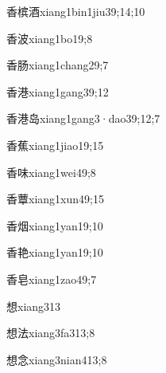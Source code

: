 \begin{verbete}{香槟酒}{xiang1bin1jiu3}{9;14;10}
\end{verbete}
\begin{verbete}{香波}{xiang1bo1}{9;8}
\end{verbete}
\begin{verbete}{香肠}{xiang1chang2}{9;7}
\end{verbete}
\begin{verbete}{香港}{xiang1gang3}{9;12}
\end{verbete}
\begin{verbete}{香港岛}{xiang1gang3·dao3}{9;12;7}
\end{verbete}
\begin{verbete}{香蕉}{xiang1jiao1}{9;15}
\end{verbete}
\begin{verbete}{香味}{xiang1wei4}{9;8}
\end{verbete}
\begin{verbete}{香蕈}{xiang1xun4}{9;15}
\end{verbete}
\begin{verbete}{香烟}{xiang1yan1}{9;10}
\end{verbete}
\begin{verbete}{香艳}{xiang1yan1}{9;10}
\end{verbete}
\begin{verbete}{香皂}{xiang1zao4}{9;7}
\end{verbete}
\begin{verbete}{想}{xiang3}{13}
\end{verbete}
\begin{verbete}{想法}{xiang3fa3}{13;8}
\end{verbete}
\begin{verbete}{想念}{xiang3nian4}{13;8}
\end{verbete}
